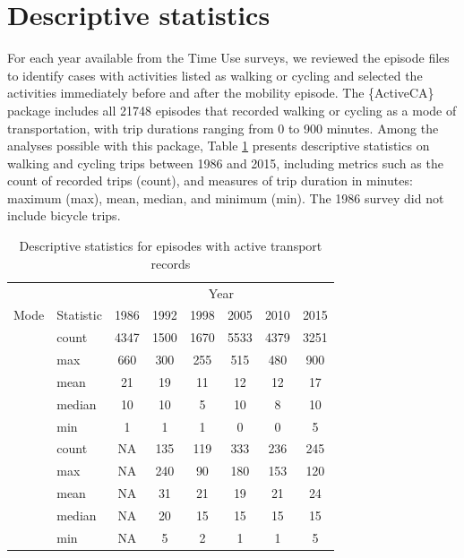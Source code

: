 \documentclass[Royal,times,sageh]{sagej}
\begin{document}
\hypertarget{descriptive-statistics}{%
\section{Descriptive statistics}\label{descriptive-statistics}}

For each year available from the Time Use surveys, we reviewed the
episode files to identify cases with activities listed as walking or
cycling and selected the activities immediately before and after the
mobility episode. The \{ActiveCA\} package includes all 21748 episodes
that recorded walking or cycling as a mode of transportation, with trip
durations ranging from 0 to 900 minutes. Among the analyses possible
with this package, Table \ref{tab:table-01} presents descriptive
statistics on walking and cycling trips between 1986 and 2015, including
metrics such as the count of recorded trips (count), and measures of
trip duration in minutes: maximum (max), mean, median, and minimum
(min). The 1986 survey did not include bicycle trips.

\begingroup\fontsize{10}{12}\selectfont

\begin{longtable}[t]{>{}llcccccc}
\caption{\label{tab:table-01}\label{tab:table-01}Descriptive statistics for episodes with active transport records}\\
\toprule
\multicolumn{2}{c}{ } & \multicolumn{6}{c}{Year} \\
\cmidrule(l{3pt}r{3pt}){3-8}
Mode & Statistic & 1986 & 1992 & 1998 & 2005 & 2010 & 2015\\
\midrule
 & count & 4347 & 1500 & 1670 & 5533 & 4379 & 3251\\
\nopagebreak
 & max & 660 & 300 & 255 & 515 & 480 & 900\\
\nopagebreak
 & mean & 21 & 19 & 11 & 12 & 12 & 17\\
\nopagebreak
 & median & 10 & 10 & 5 & 10 & 8 & 10\\
\nopagebreak
\multirow[t]{-5}{*}{\raggedright\arraybackslash \textbf{Walking}} & min & 1 & 1 & 1 & 0 & 0 & 5\\
\cmidrule{1-8}\pagebreak[0]
 & count & NA & 135 & 119 & 333 & 236 & 245\\
\nopagebreak
 & max & NA & 240 & 90 & 180 & 153 & 120\\
\nopagebreak
 & mean & NA & 31 & 21 & 19 & 21 & 24\\
\nopagebreak
 & median & NA & 20 & 15 & 15 & 15 & 15\\
\nopagebreak
\multirow[t]{-5}{*}{\raggedright\arraybackslash \textbf{Cycling}} & min & NA & 5 & 2 & 1 & 1 & 5\\
\bottomrule
\end{longtable}
\endgroup{}
\end{document}
